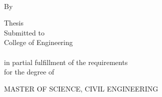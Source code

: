 %


\begin{titlepage}
	\tgherosfont
	\centering

	{\LARGE \thesisTitle} \\
	\vfill
	{\large \textsf{By} } \\[2mm]
	{\Large {\thesisName} }

	\vfill

	\textsf{Thesis} \\
	\textsf{Submitted to \thesisUniversityDepartment} \\
	\textsf{College of Engineering} \\
	\textsf{\thesisUniversity} \\
	\textsf{in partial fulfillment of the requirements} \\
	\textsf{for the degree of} \\
	\vfill

	{\large MASTER OF SCIENCE, CIVIL ENGINEERING}

	\vfill

	\textsf{\thesisDate}

\end{titlepage}


